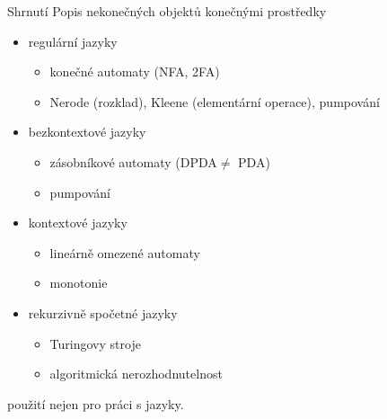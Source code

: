     
    \begin{frame}{Shrnutí}
    Popis nekonečných objektů konečnými prostředky
    \begin{itemize}
        \item regulární jazyky
        
        \begin{itemize}
            \item konečné automaty (NFA, 2FA)
            \item Nerode (rozklad), Kleene (elementární operace), pumpování
        \end{itemize}
        \item bezkontextové jazyky
        
        \begin{itemize}
            \item zásobníkové automaty (DPDA$\neq$ PDA)
            \item pumpování
        \end{itemize}
        \item kontextové jazyky
        
        \begin{itemize}
            \item lineárně omezené automaty
            \item monotonie
        \end{itemize}
        \item rekurzivně spočetné jazyky
        
        \begin{itemize}
            \item Turingovy stroje
            \item algoritmická nerozhodnutelnost
        \end{itemize}
        
    \end{itemize}
    použití nejen pro práci s jazyky.
    \end{frame}





